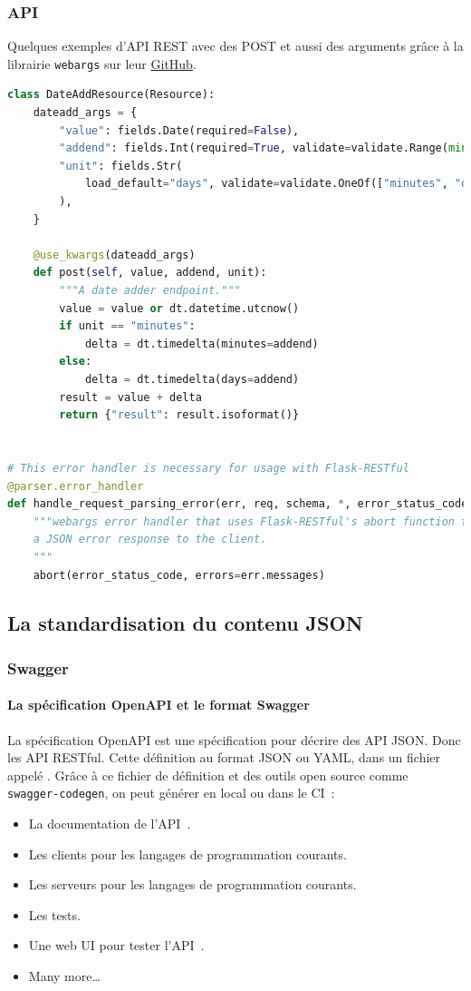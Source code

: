 \documentclass{beamer}
\begin{document}
    \begin{frame}[fragile]
        \transdissolve
        \frametitle{API}
        Quelques exemples d'API REST avec des POST et aussi des arguments grâce à la librairie \lstinline{webargs} sur leur \href{https://github.com/marshmallow-code/webargs/blob/dev/examples/flaskrestful_example.py}{GitHub}.
        \begin{lstlisting}[language=python,basicstyle=\ttfamily\tiny]
class DateAddResource(Resource):
    dateadd_args = {
        "value": fields.Date(required=False),
        "addend": fields.Int(required=True, validate=validate.Range(min=1)),
        "unit": fields.Str(
            load_default="days", validate=validate.OneOf(["minutes", "days"])
        ),
    }

    @use_kwargs(dateadd_args)
    def post(self, value, addend, unit):
        """A date adder endpoint."""
        value = value or dt.datetime.utcnow()
        if unit == "minutes":
            delta = dt.timedelta(minutes=addend)
        else:
            delta = dt.timedelta(days=addend)
        result = value + delta
        return {"result": result.isoformat()}


# This error handler is necessary for usage with Flask-RESTful
@parser.error_handler
def handle_request_parsing_error(err, req, schema, *, error_status_code, error_headers):
    """webargs error handler that uses Flask-RESTful's abort function to return
    a JSON error response to the client.
    """
    abort(error_status_code, errors=err.messages)
        \end{lstlisting}
    \end{frame}

    \subsection{La standardisation du contenu JSON}\label{subsec:api-json}

    \begin{frame}[fragile]
        \transdissolve
        \frametitle{Swagger}
        \framesubtitle{La spécification OpenAPI et le format Swagger}
        La spécification OpenAPI est une spécification pour décrire des API JSON.
        Donc les API RESTful.
        \bigbreak
        Cette définition au format JSON ou YAML, dans un fichier appelé .
        \bigbreak
        Grâce à ce fichier de définition et des outils open source comme \lstinline{swagger-codegen}, on peut générer en local ou dans le CI~:
        \begin{itemize}
            \item La documentation de l'API~.
            \item Les clients pour les langages de programmation courants.
            \item Les serveurs pour les langages de programmation courants.
            \item Les tests.
            \item Une web UI pour tester l'API~.
            \item Many more\ldots
        \end{itemize}
    \end{frame}
\end{document}
